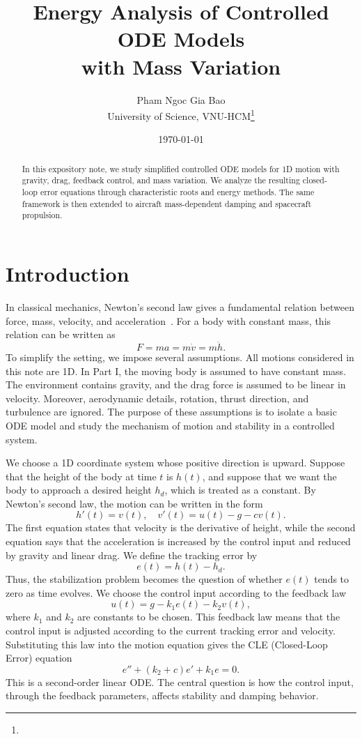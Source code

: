 ﻿\documentclass[12pt]{article}
\title{\Large Energy Analysis of Controlled ODE Models\\ with Mass Variation}
\author{
  \normalsize Pham Ngoc Gia Bao\\
  \normalsize University of Science, VNU-HCM\footnote{\authorinfo}
}
\date{\normalsize\today}
\begin{document}
\maketitle
\begin{abstract}
In this expository note, we study simplified controlled ODE models for 1D motion with gravity, drag, feedback control, and mass variation. 
We analyze the resulting closed-loop error equations through characteristic roots and energy methods. 
The same framework is then extended to aircraft mass-dependent damping and spacecraft propulsion.
\end{abstract}
\tableofcontents

\section*{Introduction}
In classical mechanics, Newton's second law gives a fundamental relation between force, mass, velocity, and acceleration~\cite{arnold_classical_mechanics}. For a body with constant mass, this relation can be written as
\[
 F = ma = m\dot v = m\ddot h.
\]
To simplify the setting, we impose several assumptions. All motions considered in this note are 1D. In Part I, the moving body is assumed to have constant mass.  The environment contains gravity, and the drag force is assumed to be linear in velocity. Moreover, aerodynamic details, rotation, thrust direction, and turbulence are ignored. The purpose of these assumptions is to isolate a basic ODE model and study the mechanism of motion and stability in a controlled system.

We choose a 1D coordinate system whose positive direction is upward. Suppose that the height of the body at time $t$ is $h(t)$, and suppose that we want the body to approach a desired height $h_d$, which is treated as a constant. By Newton's second law, the motion can be written in the form
\[
 h'(t) = v(t),\quad v'(t) = u(t) - g - cv(t).
\]
The first equation states that velocity is the derivative of height, while the second equation says that the acceleration is increased by the control input and reduced by gravity and linear drag. We define the tracking error by
\[
 e(t) = h(t) - h_d.
\]
Thus, the stabilization problem becomes the question of whether $e(t)$ tends to zero as time evolves. We choose the control input according to the feedback law
\[
 u(t) = g - k_1e(t) - k_2v(t),
\]
where $k_1$ and $k_2$ are constants to be chosen. This feedback law means that the control input is adjusted according to the current tracking error and velocity. Substituting this law into the motion equation gives the CLE (Closed-Loop Error) equation
\[
 e'' + (k_2 + c)e' + k_1e = 0.
\]
This is a second-order linear ODE. The central question is how the control input, through the feedback parameters, affects stability and damping behavior.
\end{document}
